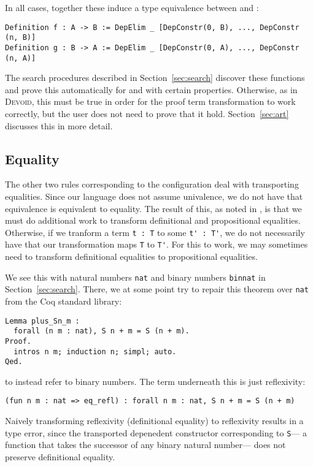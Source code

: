 In all cases, together these induce a type equivalence between \A and \B:

\begin{lstlisting}
Definition f : A -> B := DepElim _ [DepConstr(0, B), ..., DepConstr (n, B)]
Definition g : B -> A := DepElim _ [DepConstr(0, A), ..., DepConstr (n, A)]
\end{lstlisting}
The search procedures described in Section~\ref{sec:search} discover these functions and prove this automatically
for \A and \B with certain properties.
Otherwise, as in \textsc{Devoid}, this must be true in order for the proof term transformation
to work correctly, but the user does not need to prove that it hold.
Section~\ref{sec:art} discusses this in more detail.

\subsection{Equality}
\label{sec:equality}

The other two rules corresponding to the configuration deal with transporting equalities.
Since our language does not assume univalence, we do not have that equivalence is equivalent to equality.
The result of this, as noted in \citet{tabareau2019marriage},
is that we must do additional work to transform definitional and propositional equalities.
Otherwise, if we tranform a term \lstinline{t : T} to some \lstinline{t' : T'}, we do not necessarily
have that our transformation maps \lstinline{T} to \lstinline{T'}.
For this to work, we may sometimes need to transform definitional equalities to propositional equalities.

We see this with natural numbers \lstinline{nat} and binary numbers \lstinline{binnat}
in Section~\ref{sec:search}.
There, we at some point try to repair this theorem over \lstinline{nat} from the Coq standard library:

\begin{lstlisting}
Lemma plus_Sn_m :
  forall (n m : nat), S n + m = S (n + m).
Proof.
  intros n m; induction n; simpl; auto.
Qed.
\end{lstlisting}
to instead refer to binary numbers.
The term underneath this is just reflexivity:

\begin{lstlisting}
(fun n m : nat => eq_refl) : forall n m : nat, S n + m = S (n + m)
\end{lstlisting}
Naively transforming reflexivity (definitional equality) to reflexivity results in a type error,
since the transported depenedent constructor corresponding to \lstinline{S}---
a function that takes the successor of any binary natural number---
does not preserve definitional equality.

